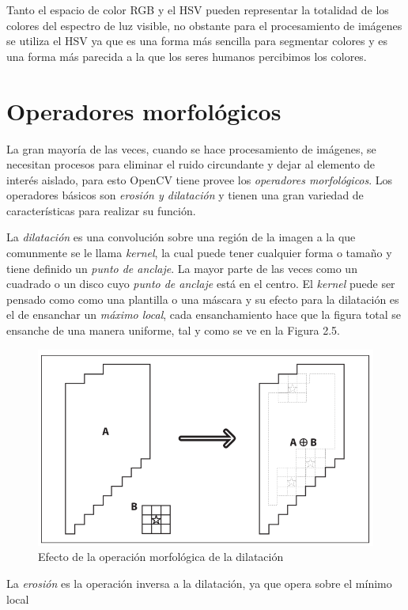 \documentclass{book}
\begin{document}
Tanto el espacio de color RGB y el HSV pueden representar la totalidad de los colores del espectro de luz visible, no obstante para el procesamiento de imágenes se utiliza el HSV ya que es una forma más sencilla para segmentar colores y es una forma más parecida a la que los seres humanos percibimos los colores.

\section{Operadores morfológicos}	
La gran mayoría de las veces, cuando se hace procesamiento de imágenes, se necesitan procesos para eliminar el ruido circundante y dejar al elemento de interés aislado, para esto OpenCV tiene provee los \textit{operadores morfológicos}. Los operadores básicos son \textit{erosión y dilatación} y tienen una gran variedad de características para realizar su función.

La \textit{dilatación} es una convolución sobre una región de la imagen a la que comunmente se le llama \textit{kernel}, la cual puede tener cualquier forma o tamaño y tiene definido un \textit{punto de anclaje}. La mayor parte de las veces como un cuadrado o un disco cuyo \textit{punto de anclaje} está en el centro. El \textit{kernel} puede ser pensado como como una plantilla o una máscara y su efecto para la dilatación es el de ensanchar un \textit{máximo local}, cada ensanchamiento hace que la figura total se ensanche de una manera uniforme, tal y como se ve en la Figura 2.5.
\begin{figure}
	\centering		
	\includegraphics[scale=0.4]{images/dilatacion.png}
	\caption{Efecto de la operación morfológica de la dilatación}		
\end{figure}
 La \textit{erosión} es la operación inversa a la dilatación, ya que opera sobre el mínimo local 
\end{document}

